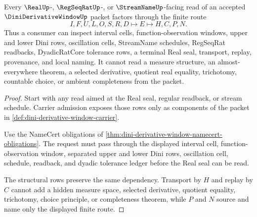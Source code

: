\begin{theorem}
\label{thm:dini-derivative-window-real-seal-nonescape}
Every $\RealUp$-, $\RegSeqRatUp$-, or $\StreamNameUp$-facing read of an accepted $\DiniDerivativeWindowUp$ packet factors through the finite route
$$
I,F,U,L,O,S,R,D \longmapsto E \longmapsto H,C,P,N .
$$
Thus a consumer can inspect interval cells, function-observation windows, upper and lower Dini rows, oscillation cells, StreamName schedules, RegSeqRat readbacks, DyadicRatCore tolerance rows, a terminal Real seal, transport, replay, provenance, and local naming. It cannot read a measure structure, an almost-everywhere theorem, a selected derivative, quotient real equality, trichotomy, countable choice, or ambient completeness from the packet.
\end{theorem}
\begin{proof}
Start with any read aimed at the Real seal, regular readback, or stream schedule. Carrier admission exposes those rows only as components of the packet in \autoref{def:dini-derivative-window-carrier}.

Use the NameCert obligations of \autoref{thm:dini-derivative-window-namecert-obligations}. The request must pass through the displayed interval cell, function-observation window, separated upper and lower Dini rows, oscillation cell, schedule, readback, and dyadic tolerance ledger before the Real seal can be read.

The structural rows preserve the same dependency. Transport by $H$ and replay by $C$ cannot add a hidden measure space, selected derivative, quotient equality, trichotomy, choice principle, or completeness theorem, while $P$ and $N$ source and name only the displayed finite route.
\end{proof}



